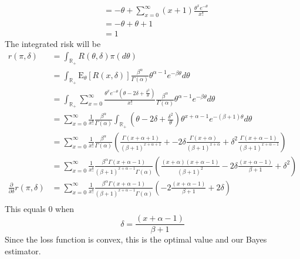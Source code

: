 \documentclass[11pt]{article}
\newcommand{\R}{\mathbb{R}}
\newcommand{\E}{\mathrm{E}}
\theoremstyle{definition}
\begin{document}
\begin{itemize}
\begin{align*}
                        &= -\theta + \sum_{x=0}^\infty (x+1)\frac{\theta^{x}e^{-\theta}}{x!} \\
                        &= -\theta + \theta + 1 \\
                        &= 1
        \end{align*}
        The integrated risk will be 
        \begin{align*}
            r(\pi,\delta) &= \int_{\R_+} R(\theta,\delta)\pi(d\theta) \\
                          &= \int_{\R_+} \E_\theta[R(x,\delta)] \frac{\beta^\alpha}{\Gamma(\alpha)}\theta^{\alpha-1}e^{-\beta\theta}d\theta \\
                          &= \int_{\R_+}\sum_{x=0}^\infty  
                                \frac{\theta^xe^{-\theta}(\theta-2\delta +\frac{\delta^2}{\theta})}{x!} 
                                \frac{\beta^\alpha}{\Gamma(\alpha)}\theta^{\alpha-1}e^{-\beta\theta}d\theta \\
                          &= \sum_{x=0}^\infty \frac{1}{x!}\frac{\beta^\alpha}{\Gamma(\alpha)} \int_{\R_+} 
                                (\theta-2\delta +\frac{\delta^2}{\theta}) 
                                \theta^{x+\alpha-1}e^{-(\beta+1)\theta}d\theta \\        
                          &= \sum_{x=0}^\infty \frac{1}{x!}\frac{\beta^\alpha}{\Gamma(\alpha)} 
                                \left(\frac{\Gamma(x+\alpha+1)}{(\beta+1)^{x+\alpha+1}} + 
                                      -2\delta\frac{\Gamma(x+\alpha)}{(\beta+1)^{x+\alpha}} + 
                                  \delta^2\frac{\Gamma(x+\alpha-1)}{(\beta+1)^{x+\alpha-1}} \right) \\
                          &= \sum_{x=0}^\infty \frac{1}{x!}\frac{\beta^\alpha\Gamma(x+\alpha-1)}{(\beta+1)^{x+\alpha-1}\Gamma(\alpha)} 
                                  \left(\frac{(x+\alpha)(x+\alpha-1)}{(\beta+1)^2} -2\delta \frac{(x+\alpha-1)}{\beta+1} + \delta^2\right)  \\
            \frac{\partial}{\partial \delta} r(\pi,\delta) &= \sum_{x=0}^\infty \frac{1}{x!}\frac{\beta^\alpha\Gamma(x+\alpha-1)}{(\beta+1)^{x+\alpha-1}\Gamma(\alpha)}
                                \left(-2\frac{(x+\alpha-1)}{\beta+1} + 2\delta\right)  \\
        \end{align*}
        This equals $0$ when 
        \[ \delta = \frac{(x+\alpha-1)}{\beta+1} \]
        Since the loss function is convex, this is the optimal value and our Bayes estimator.

\end{itemize}
\end{document}
